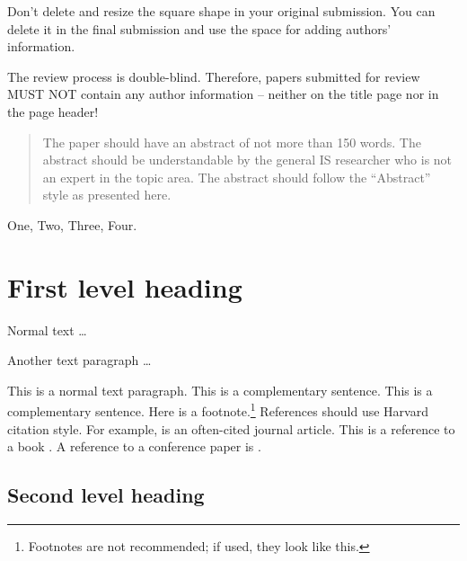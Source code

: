 \documentclass[a4paper,11pt,article,oneside]{memoir}
\begin{document}
\noindent\fbox{%
	\parbox{\textwidth}{%
		\hfill{}
		\vspace{10em}
	}%
}

Don’t delete and resize the square shape in your original submission. You can delete it in the final submission and use the space for adding authors’ information.

The review process is double-blind. Therefore, papers submitted for review MUST NOT contain any author information – neither on the title page nor in the page header!

\begin{abstract}\noindent
  The paper should have an abstract of not more than 150 words. The abstract should be understandable by the general IS researcher who is not an expert in the topic area. The abstract should follow the “Abstract” style as presented here.
\end{abstract}

\begin{keywords}
  One, Two, Three, Four.
\end{keywords}



\chapter{First level heading}

Normal text \dots

Another text paragraph \dots

This is a normal text paragraph. This is a complementary sentence. 
This is a complementary sentence. Here is a footnote.\footnote{Footnotes are not recommended; if used, they look like this.} References should use Harvard citation style. For example, \citet{markus.1988} is an often-cited journal article. This is a reference to a book \citep[p.~20]{avison.1995}. A reference to a conference paper is \citet{Kude2014adaptation}.

\section{Second level heading}
\end{document}
